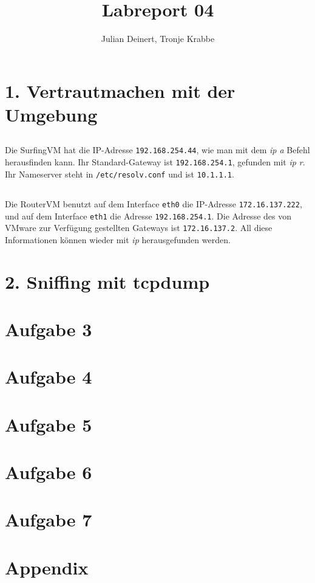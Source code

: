 \documentclass[10pt,a4paper]{article}
\author{Julian Deinert, Tronje Krabbe}
\title{Labreport 04}
\begin{document}
\maketitle
\tableofcontents
\newpage


\section*{1. Vertrautmachen mit der Umgebung}
\setcounter{subsection}{1}

\subsection{}
Die SurfingVM hat die IP-Adresse \texttt{192.168.254.44}, wie man mit dem \textit{ip a} Befehl herausfinden kann.
Ihr Standard-Gateway ist \texttt{192.168.254.1}, gefunden mit \textit{ip r}.
Ihr Nameserver steht in \texttt{/etc/resolv.conf} und ist \texttt{10.1.1.1}.

\subsection{}
Die RouterVM benutzt auf dem Interface \texttt{eth0} die IP-Adresse \texttt{172.16.137.222},
und auf dem Interface \texttt{eth1} die Adresse \texttt{192.168.254.1}.
Die Adresse des von VMware zur Verfügung gestellten Gateways ist \texttt{172.16.137.2}.
All diese Informationen können wieder mit \textit{ip} herausgefunden werden.


\setcounter{section}{2}
\setcounter{subsection}{0}
\section*{2. Sniffing mit tcpdump}
\setcounter{subsection}{1}

\subsection{}


\setcounter{section}{3}
\setcounter{subsection}{0}
\section*{Aufgabe 3}

\section*{Aufgabe 4}
\setcounter{subsection}{0}

\section*{Aufgabe 5}
\setcounter{subsection}{0}

\section*{Aufgabe 6}

\section*{Aufgabe 7}

\newpage
\section*{Appendix}
\end{document}
